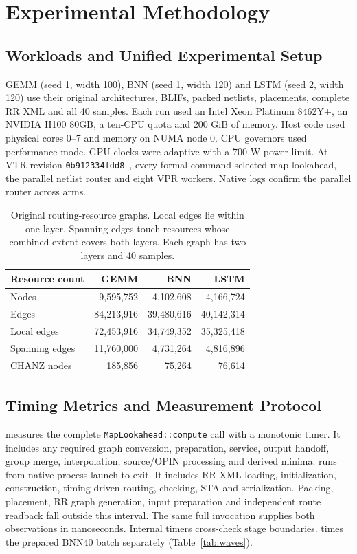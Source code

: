 \section{Experimental Methodology}
\subsection{Workloads and Unified Experimental Setup}
GEMM (seed 1, width 100), BNN (seed 1, width 120) and LSTM (seed 2, width 120) use their original architectures, BLIFs, packed netlists, placements, complete RR XML and all 40 samples. Each run used an Intel Xeon Platinum 8462Y+, an NVIDIA H100 80GB, a ten-CPU quota and 200 GiB of memory. Host code used physical cores 0--7 and memory on NUMA node 0. CPU governors used performance mode. GPU clocks were adaptive with a 700 W power limit. At VTR revision \texttt{0b912334fdd8}~\cite{lockedvtr}, every formal command selected map lookahead, the parallel netlist router and eight VPR workers. Native logs confirm the parallel router across arms.
\begin{table}[t]\centering\caption{Original routing-resource graphs. Local edges lie within one layer. Spanning edges touch resources whose combined extent covers both layers. Each graph has two layers and 40 samples.}\label{tab:rr}
\begin{tabular}{@{}lrrr@{}}\toprule
Resource count & GEMM & BNN & LSTM\\\midrule
Nodes & 9,595,752 & 4,102,608 & 4,166,724\\
Edges & 84,213,916 & 39,480,616 & 40,142,314\\
Local edges & 72,453,916 & 34,749,352 & 35,325,418\\
Spanning edges & 11,760,000 & 4,731,264 & 4,816,896\\
CHANZ nodes & 185,856 & 75,264 & 76,614\\
\bottomrule\end{tabular}
\end{table}
\subsection{Timing Metrics and Measurement Protocol}
\constructiontime{} measures the complete \texttt{MapLookahead::compute} call with a monotonic timer. It includes any required graph conversion, preparation, service, output handoff, group merge, interpolation, source/OPIN processing and derived minima. \processtime{} runs from native process launch to exit. It includes RR XML loading, initialization, construction, timing-driven routing, checking, STA and serialization. Packing, placement, RR graph generation, input preparation and independent route readback fall outside this interval. The same full invocation supplies both observations in nanoseconds. Internal timers cross-check stage boundaries. \batchservice{} times the prepared BNN40 batch separately (Table~\ref{tab:waves}).

